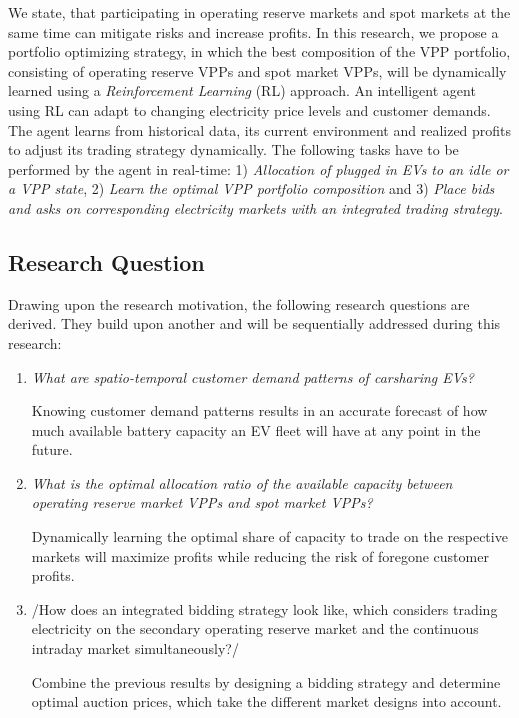 \documentclass[a4paper, 12pt]{article}
\begin{document}
We state, that participating in operating reserve markets and spot markets at
the same time can mitigate risks and increase profits. In this research, we
propose a portfolio optimizing strategy, in which the best composition of the
VPP portfolio, consisting of operating reserve VPPs and spot market VPPs, will
be dynamically learned using a \emph{Reinforcement Learning} (RL) approach. An
intelligent agent using RL can adapt to changing electricity price levels and
customer demands. The agent learns from historical data, its current environment
and realized profits to adjust its trading strategy dynamically. The following
tasks have to be performed by the agent in real-time: 1) \emph{Allocation of plugged
in EVs to an idle or a VPP state}, 2) \emph{Learn the optimal VPP portfolio
composition} and 3) \emph{Place bids and asks on corresponding electricity markets
with an integrated trading strategy}.

\subsection{Research Question}
\label{sec:org28ba08b}

Drawing upon the research motivation, the following research questions are
derived. They build upon another and will be sequentially addressed during this
research:

\begin{enumerate}
\item \emph{What are spatio-temporal customer demand patterns of carsharing EVs?}

Knowing customer demand patterns results in an accurate forecast of how much
available battery capacity an EV fleet will have at any point in the future.

\item \emph{What is the optimal allocation ratio of the available capacity between operating
reserve market VPPs and spot market VPPs?}

Dynamically learning the optimal share of capacity to trade on the respective
markets will maximize profits while reducing the risk of foregone customer
profits.

\item /How does an integrated bidding strategy look like, which considers trading
electricity on the secondary operating reserve market and the continuous
intraday market simultaneously?/

Combine the previous results by designing a bidding strategy and determine
optimal auction prices, which take the different market designs into account.
\end{enumerate}
\end{document}
